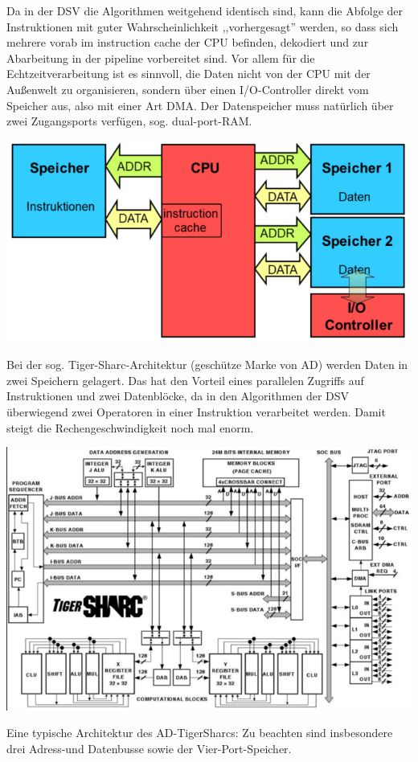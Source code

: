 \documentclass[a4paper]{article}
\begin{document}
\begin{multicols}{3}
\begin{itemize*}
    \begin{itemize*}
      \item Da in der DSV die Algorithmen weitgehend identisch sind, kann die Abfolge der Instruktionen mit guter Wahrscheinlichkeit ,,vorhergesagt'' werden, so dass sich mehrere vorab im instruction cache der CPU befinden, dekodiert und zur Abarbeitung in der pipeline vorbereitet sind. Vor allem für die Echtzeitverarbeitung ist es sinnvoll, die Daten nicht von der CPU mit der Außenwelt zu organisieren, sondern über einen I/O-Controller direkt vom Speicher aus, also mit einer Art DMA. Der Datenspeicher muss natürlich über zwei Zugangsports verfügen, sog. dual-port-RAM.
    \end{itemize*}
    \item \includegraphics[width=.5\linewidth]{Assets/Biosignalverarbeitung-tiger-super-harvard.png}
    \begin{itemize*}
      \item Bei der sog. Tiger-Sharc-Architektur (geschütze Marke von AD) werden Daten in zwei Speichern gelagert. Das hat den Vorteil eines parallelen Zugriffs auf Instruktionen und zwei Datenblöcke, da in den Algorithmen der DSV überwiegend zwei Operatoren in einer Instruktion verarbeitet werden. Damit steigt die Rechengeschwindigkeit noch mal enorm.
      \item \includegraphics[width=.5\linewidth]{Assets/Biosignalverarbeitung-ad-tigersharcs.png}
      \item Eine typische Architektur des AD-TigerSharcs: Zu beachten sind insbesondere drei Adress-und Datenbusse sowie der Vier-Port-Speicher.
    \end{itemize*}
  \end{itemize*}


\end{multicols}
\end{document}
